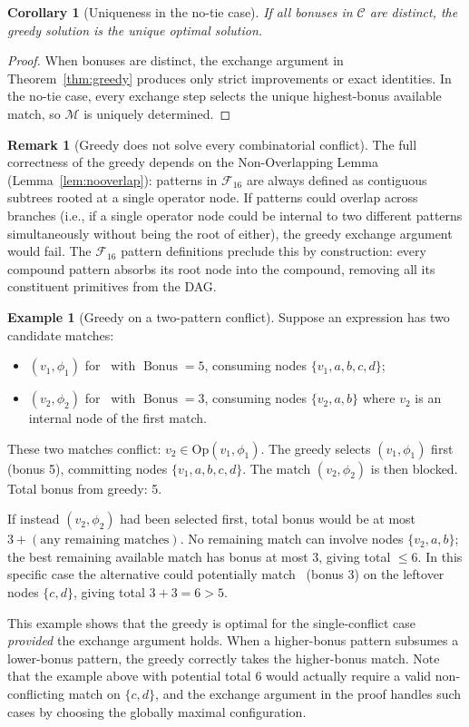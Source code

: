\documentclass[12pt,a4paper]{article}
\newtheorem{corollary}[theorem]{Corollary}
\theoremstyle{definition}
\newtheorem{remark}[theorem]{Remark}
\newtheorem{example}[theorem]{Example}
\newcommand{\EML}{\operatorname{EML}}
\newcommand{\EMN}{\operatorname{EMN}}
\newcommand{\DEML}{\operatorname{DEML}}
\newcommand{\Bonus}{\operatorname{Bonus}}
\begin{document}
\begin{corollary}[Uniqueness in the no-tie case]
\label{cor:unique}
If all bonuses in $\mathcal{C}$ are distinct, the greedy solution is
the unique optimal solution.
\end{corollary}

\begin{proof}
When bonuses are distinct, the exchange argument in
Theorem~\ref{thm:greedy} produces only strict improvements or exact
identities.  In the no-tie case, every exchange step selects the unique
highest-bonus available match, so $\mathcal{M}$ is uniquely determined.
\end{proof}

\begin{remark}[Greedy does not solve every combinatorial conflict]
The full correctness of the greedy depends on the
Non-Overlapping Lemma (Lemma~\ref{lem:nooverlap}): patterns
in $\mathcal{F}_{16}$ are always defined as contiguous subtrees rooted
at a single operator node.  If patterns could overlap across branches
(i.e., if a single operator node could be internal to two different
patterns simultaneously without being the root of either), the greedy
exchange argument would fail.  The $\mathcal{F}_{16}$ pattern
definitions preclude this by construction: every compound pattern
absorbs its root node into the compound, removing all its constituent
primitives from the DAG.
\end{remark}

\begin{example}[Greedy on a two-pattern conflict]
\label{ex:conflict}
Suppose an expression has two candidate matches:
\begin{itemize}
  \item $(v_1, \phi_1)$ for \DEML\ with $\Bonus = 5$, consuming nodes
        $\{v_1, a, b, c, d\}$;
  \item $(v_2, \phi_2)$ for \EML\ with $\Bonus = 3$, consuming nodes
        $\{v_2, a, b\}$ where $v_2$ is an internal node of the first match.
\end{itemize}
These two matches conflict: $v_2 \in \mathrm{Op}(v_1, \phi_1)$.
The greedy selects $(v_1, \phi_1)$ first (bonus 5), committing nodes
$\{v_1, a, b, c, d\}$.  The match $(v_2, \phi_2)$ is then blocked.
Total bonus from greedy: 5.

If instead $(v_2, \phi_2)$ had been selected first, total bonus would
be at most $3 + (\text{any remaining matches})$.  No remaining match
can involve nodes $\{v_2, a, b\}$; the best remaining available match
has bonus at most 3, giving total $\leq 6$.  In this specific case the
alternative could potentially match \EMN\ (bonus 3) on the leftover
nodes $\{c, d\}$, giving total $3 + 3 = 6 > 5$.

This example shows that the greedy is optimal for the single-conflict
case \emph{provided} the exchange argument holds.  When a higher-bonus
pattern subsumes a lower-bonus pattern, the greedy correctly takes the
higher-bonus match.  Note that the example above with potential total 6
would actually require a valid non-conflicting match on $\{c, d\}$, and
the exchange argument in the proof handles such cases by choosing the
globally maximal configuration.
\end{example}
\end{document}
